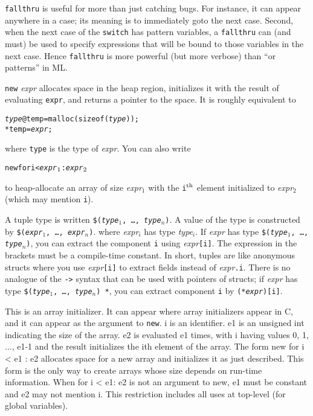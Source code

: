\texttt{fallthru} is useful for more than just catching bugs.  For
instance, it can appear anywhere in a case; its meaning is to
immediately goto the next case.  Second, when the next case of the
\texttt{switch} has pattern variables, a \texttt{fallthru} can (and
must) be used to specify expressions that will be bound to those
variables in the next case.  Hence \texttt{fallthru} is more powerful
(but more verbose) than ``or patterns'' in ML\@.


\texttt{new} \textit{expr} allocates space in the heap region,
initializes it with the result of evaluating \texttt{expr}, and
returns a pointer to the space.  It is roughly equivalent to
\begin{alltt}
 \textit{type} @temp = malloc(sizeof(\textit{type}));
 *temp = \textit{expr};
\end{alltt}
where \texttt{type} is the type of \textit{expr}.  You can also write
\begin{alltt}
  new \lb for i < \textit{expr}\(\sb{1}\) : \textit{expr}\(\sb{2}\) \rb
\end{alltt}
to heap-allocate an array of size \textit{expr}$_1$ with the
\texttt{i}$^{\rm th}$ element initialized to \textit{expr}$_2$ (which
may mention \texttt{i}).


A tuple type is written
\texttt{\$(\textit{type}$_1$, \ldots, \textit{type}$_n$)}.
A value of the type is constructed by
\texttt{\$(\textit{expr}$_1$, \ldots, \textit{expr}$_n$)}.
where \textit{expr}$_i$ has type \textit{type}$_i$.  
If \textit{expr} has type
\texttt{\$(\textit{type}$_1$, \ldots, \textit{type}$_n$)},
you can extract the component \texttt{i} using
\textit{expr}\texttt{[i]}.
The expression in the brackets must be a compile-time constant.  In
short, tuples are like anonymous structs where you use
\textit{expr}\texttt{[i]} to extract fields instead of
\textit{expr}\texttt{.i}.
There is no analogue of the \texttt{->} syntax that can be used with
pointers of structs; if 
\textit{expr} has type
\texttt{\$(\textit{type}$_1$, \ldots, \textit{type}$_n$) *},
you can extract component \texttt{i} by \texttt{(*\textit{expr})[i]}.


This is an array initializer.  It can appear where array
initializers appear in C, and it can appear as the argument to
\texttt{new}.
i
is an identifier.  e1 is an unsigned int indicating the size of the
array.  e2 is evaluated e1 times, with i having values 0, 1, ..., e1-1
and the result initializes the ith element of the array.  The form new
{for i < e1 : e2} allocates space for a new array and initializes it
as just described.  This form is the only way to create arrays whose
size depends on run-time information.  When {for i < e1: e2} is not an
argument to new, e1 must be constant and e2 may not mention i.  This
restriction includes all uses at top-level (for global variables).

